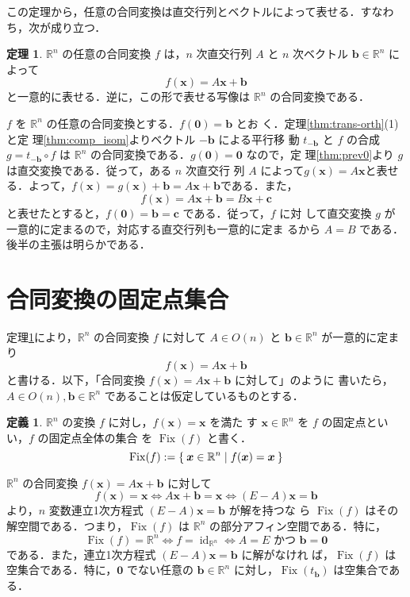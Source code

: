 \documentclass[11pt, uplatex, dvipdfmx, titlepage]{jsarticle}
\makeatletter
\DeclareMathOperator{\Fix}{Fix}
\DeclareMathOperator{\id}{id}
\renewenvironment{proof}[1][\proofname]{\par
  \pushQED{\qed}%
  \normalfont \topsep6\p@\@plus6\p@\relax
  \trivlist
  \item[\hskip\labelsep
         \bfseries
    {#1}]\ignorespaces
}{%
  \popQED\endtrivlist\@endpefalse
}
\theoremstyle{definition}
\newtheorem{theorem}{定理}[section]
\newtheorem*{definition}{定義}
\renewcommand{\proofname}{\textbf{証明}}
\makeatother
\begin{document}
この定理から，任意の合同変換は直交行列とベクトルによって表せる．すなわち，次が成り立つ．

\begin{theorem}\label{thm:affine_rep}
  $\mathbb{R}^n$ の任意の合同変換 $f$ は，$n$ 次直交行列 $A$
  と $n$ 次ベクトル $\bm{b} \in \mathbb{R}^n$ によって
  \[
    f(\bm{x}) = A\bm{x} + \bm{b}
  \]
  と一意的に表せる．逆に，この形で表せる写像は $\mathbb{R}^n$ の合同変換である．
\end{theorem}


\begin{proof}
  $f$ を $\mathbb{R}^n$ の任意の合同変換とする．$f(\bm{0})=\bm{b}$ とお
  く．定理\ref{thm:trans-orth}(1)と定
  理\ref{thm:comp_isom}よりベクトル $-\bm{b}$ による平行移
  動 $t_{-\bm{b}}$ と $f$ の合成 $g = t_{-\bm{b}} \circ
  f$ は $\mathbb{R}^n$ の合同変換である．$g(\bm{0})=\bm{0}$ なので，定
  理\ref{thm:prev0}より $g$は直交変換である．従って，ある $n$ 次直交行
  列 $A$
  によって$g(\bm{x})=A\bm{x}$と表せる．よって，$f(\bm{x}) =
  g(\bm{x})+\bm{b} = A\bm{x} + \bm{b}$である．また，
  \[
    f(\bm{x}) = A\bm{x}+\bm{b} = B\bm{x} + \bm{c}
  \]
  と表せたとすると，$f(\bm{0})=\bm{b}=\bm{c}$ である．従って，$f$ に対
  して直交変換 $g$ が一意的に定まるので，対応する直交行列も一意的に定ま
  るから $A=B$ である．後半の主張は明らかである．
\end{proof}

\newpage

\section{合同変換の固定点集合}\label{sec:invariants}

定理\ref{thm:affine_rep}により，$\mathbb{R}^n$ の合同変換 $f$ に対して $A
\in O(n)$ と $\bm{b} \in \mathbb{R}^n$ が一意的に定まり
\[
  f(\bm{x}) = A\bm{x} + \bm{b}
\]
と書ける．以下，「合同変換 $f(\bm{x}) = A\bm{x} + \bm{b}$ に対して」のように
書いたら，$A \in O(n), \bm{b} \in \mathbb{R}^n$ であることは仮定しているものとする．


\begin{definition}
  $\mathbb{R}^n$ の変換 $f$ に対し，$f(\bm{x}) = \bm{x}$ を満た
  す $\bm{x} \in \mathbb{R}^n$ を $f$ の固定点といい，$f$ の固定点全体の集合
  を $\Fix(f)$ と書く．
  \[
    \Fix(f) := \Set{\bm{x} \in \mathbb{R}^n | f(\bm{x}) = \bm{x}}
  \]
\end{definition}

$\mathbb{R}^n$ の合同変換 $f(\bm{x}) = A\bm{x} + \bm{b}$ に対して
\[
  f(\bm{x}) = \bm{x} \Leftrightarrow A\bm{x}+\bm{b} = \bm{x} \Leftrightarrow (E-A)\bm{x} = \bm{b}
\]
より，$n$ 変数連立1次方程式 $(E-A)\bm{x} = \bm{b}$ が解を持つな
ら $\Fix(f)$ はその解空間である．つまり，$\Fix (f)$ は $\mathbb{R}^n$
の部分アフィン空間である．特に，
\[
  \Fix(f) = \mathbb{R}^n \Leftrightarrow f = \id_{\mathbb{R}^n} \Leftrightarrow 
  A=E \text{ かつ }\bm{b}=\bm{0}
\]
である．また，連立1次方程式 $(E-A)\bm{x} = \bm{b}$ に解がなけれ
ば，$\Fix(f)$ は空集合である．特に，$\bm{0}$ でない任意の $\bm{b} \in
\mathbb{R}^n$ に対し，$\Fix \left (t_{\bm{b}} \right)$ は空集合である．
\end{document}

